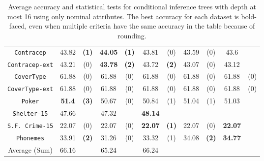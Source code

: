 \begin{table}
\begin{tabular}{c|cc|cc|cc|cc|cc}
{\tt Contracep}     & 43.82      &  {\bf (1)}        &   {\bf 44.05}& {\bf (1)}       &  43.81      &  (0)                 & 43.59       & (0)            & 43.6        &             \\
{\tt Contracep-ext} & 43.21      &  (0)              &   {\bf 43.78}& {\bf (2)}       &  43.72      &  {\bf (2)}           & 43.07       & (0)            & 43.12       &             \\
{\tt CoverType}     & 61.88      &  (0)              &   61.88      & (0)             &  61.88      &  (0)                 & 61.88       & (0)            & 61.88       &             (0) \\
{\tt CoverType-ext} & 61.88      &  (0)              &   61.88      & (0)             &  61.88      &  (0)                 & 61.88       & (0)            & 61.88       &             (0) \\
{\tt Poker}         & {\bf 51.4} &  {\bf (3)}        &   50.67      & (0)             &  50.84      &  (1)                 & 51.04       & (1)            & 51.03       &             \\
{\tt Shelter-15}    & 47.66      &                   &   47.32      &                 & {\bf 48.14} &                      &             &                &             &             \\
{\tt S.F. Crime-15} & 22.07      &  (0)              &   22.07      & (0)             & {\bf 22.07} &  {\bf (1)}           & 22.07       & (0)            & {\bf 22.07} &             \\
{\tt Phonemes}      & 33.91      &  {\bf (2)}        &   31.26      & (0)             &  33.32      &  (1)                 & 34.08       & {\bf (2)}      & {\bf 34.77} &             \\
\hline
Average (Sum)       & 66.16      &                   &   65.24      &                 &  66.24      &                      &             &                &             &
       \end{tabular}
        \caption{Average accuracy and statistical tests  for  conditional inference trees 
with depth at most 16 using only nominal attributes. The best accuracy for each dataset is bold-faced, even when multiple criteria have the same accuracy in the table because of rounding.}
\label{tab:ctree-16}
\normalsize
\end{table}


